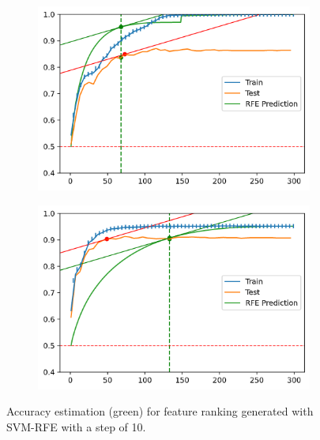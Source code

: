 \begin{figure}[h]
    \centering
    \begin{subfigure}[b]{0.4\linewidth}
        \includegraphics[width=\linewidth]{img/ch5/stopcond/aprox-good.png}
    \end{subfigure}
    \begin{subfigure}[b]{0.4\linewidth}
        \includegraphics[width=\linewidth]{img/ch5/stopcond/aprox-bad.png}
    \end{subfigure}
    \caption[Stop condition: Comparison by good and bad examples]{Accuracy estimation (green) for feature ranking generated with SVM-RFE with a step of 10.}
    \label{fig:ch5.stopcond.main}
\end{figure}

